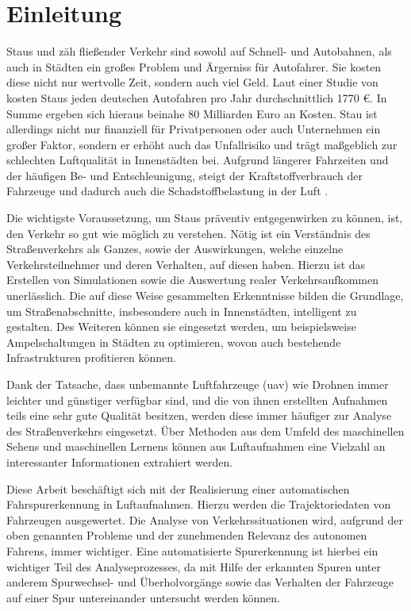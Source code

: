 
\chapter{Einleitung}
\label{cha:introduction}

Staus und zäh fließender Verkehr sind sowohl auf Schnell- und Autobahnen, als auch in Städten ein großes
Problem und Ärgerniss für Autofahrer. Sie kosten diese nicht nur wertvolle Zeit, sondern auch viel Geld.
Laut einer Studie von \cite[]{Cookson} kosten Staus jeden deutschen Autofahren pro Jahr durchschnittlich 1770 €.
In Summe ergeben sich hieraus beinahe 80 Milliarden Euro an Kosten.
Stau ist allerdings nicht nur finanziell für Privatpersonen oder auch Unternehmen ein großer Faktor,
sondern er erhöht auch das Unfallrisiko und trägt maßgeblich zur schlechten Luftqualität in Innenstädten bei.
Aufgrund längerer Fahrzeiten und der häufigen Be- und Entschleunigung, steigt der Kraftstoffverbrauch der
Fahrzeuge und dadurch auch die Schadstoffbelastung in der Luft \cite[]{Hemmerle2016}.

Die wichtigste Voraussetzung, um Staus präventiv entgegenwirken zu können, ist, den Verkehr so gut wie
möglich zu verstehen. Nötig ist ein Verständnis des Straßenverkehrs als Ganzes, sowie der Auswirkungen,
welche einzelne Verkehrsteilnehmer und deren Verhalten, auf diesen haben. Hierzu ist das Erstellen von
Simulationen sowie die Auswertung realer Verkehrsaufkommen unerlässlich.
Die auf diese Weise gesammelten Erkenntnisse bilden die Grundlage, um Straßenabschnitte, insbesondere
auch in Innenstädten, intelligent zu gestalten.
Des Weiteren können sie eingesetzt werden, um beispielsweise Ampelschaltungen in Städten zu optimieren,
wovon auch bestehende Infrastrukturen profitieren können.

Dank der Tatsache, dass unbemannte Luftfahrzeuge (\acrshort*{uav}) wie Drohnen immer leichter und günstiger
verfügbar sind, und die von ihnen erstellten Aufnahmen teils eine sehr gute Qualität besitzen, werden
diese immer häufiger zur Analyse des Straßenverkehrs eingesetzt. Über Methoden aus dem Umfeld des
maschinellen Sehens und maschinellen Lernens können aus Luftaufnahmen eine Vielzahl an interessanter
Informationen extrahiert werden.

Diese Arbeit beschäftigt sich mit der Realisierung einer automatischen Fahrspurerkennung in Luftaufnahmen.
Hierzu werden die Trajektoriedaten von Fahrzeugen ausgewertet.
Die Analyse von Verkehrssituationen wird, aufgrund der oben genannten Probleme und der zunehmenden Relevanz
des autonomen Fahrens, immer wichtiger.
Eine automatisierte Spurerkennung ist hierbei ein wichtiger Teil des Analyseprozesses, da mit Hilfe der
erkannten Spuren unter anderem Spurwechsel- und Überholvorgänge sowie das Verhalten der Fahrzeuge
auf einer Spur untereinander untersucht werden können.

